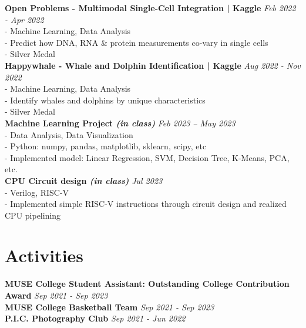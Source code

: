 \documentclass[a4paper,10pt]{article}
\begin{document}
\textbf{Open Problems - Multimodal Single-Cell Integration | Kaggle} \hfill \textit{Feb 2022 - Apr 2022}\\
- Machine Learning, Data Analysis\\
- Predict how DNA, RNA \& protein measurements co-vary in single cells\\
- Silver Medal\\
\textbf{Happywhale - Whale and Dolphin Identification | Kaggle} \hfill \textit{Aug 2022 - Nov 2022}\\
- Machine Learning, Data Analysis\\
- Identify whales and dolphins by unique characteristics\\
- Silver Medal\\
\textbf{Machine Learning Project \textit{(in class)}} \hfill \textit{Feb 2023 -- May 2023}\\
- Data Analysis, Data Visualization\\
- Python: numpy, pandas, matplotlib, sklearn, scipy, etc\\
- Implemented model: Linear Regression, SVM, Decision Tree, K-Means, PCA, etc.\\
\textbf{CPU Circuit design \textit{(in class)}} \hfill \textit{Jul 2023}\\
- Verilog, RISC-V\\
- Implemented simple RISC-V instructions through circuit design and realized CPU pipelining

\section*{Activities}
\textbf{MUSE College Student Assistant: Outstanding College Contribution Award} \hfill \textit{Sep 2021 - Sep 2023}\\
\textbf{MUSE College Basketball Team} \hfill \textit{Sep 2021 - Sep 2023}\\
\textbf{P.I.C. Photography Club} \hfill \textit{Sep 2021 - Jun 2022}
\end{document}
